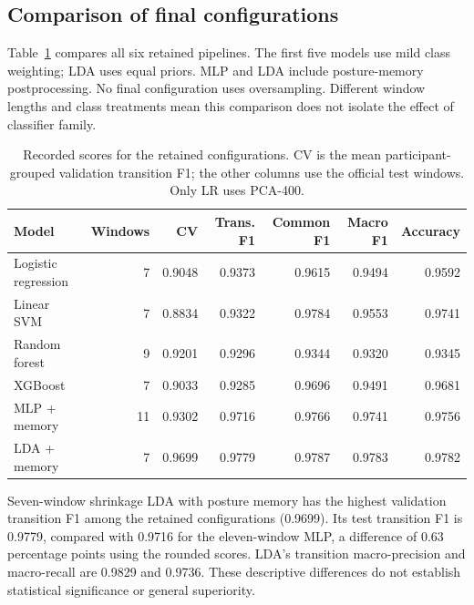 \subsection{Comparison of final configurations}
Table~\ref{tab:final-evaluation} compares all six retained pipelines. The first
five models use mild class weighting; LDA uses equal priors. MLP and LDA
include posture-memory postprocessing. No final configuration uses oversampling.
Different window lengths and class treatments mean this comparison does not
isolate the effect of classifier family.

\begin{table}[t]
\centering
\small
\caption{Recorded scores for the retained configurations. CV is the mean
participant-grouped validation transition F1; the other columns use the official
test windows. Only LR uses PCA-400.}
\label{tab:final-evaluation}
\begin{tabular}{lrrrrrr}
\hline
Model & Windows & CV & Trans. F1 & Common F1 & Macro F1 & Accuracy \\
\hline
Logistic regression & 7 & 0.9048 & 0.9373 & 0.9615 & 0.9494 & 0.9592 \\
Linear SVM          & 7 & 0.8834 & 0.9322 & 0.9784 & 0.9553 & 0.9741 \\
Random forest       & 9 & 0.9201 & 0.9296 & 0.9344 & 0.9320 & 0.9345 \\
XGBoost             & 7 & 0.9033 & 0.9285 & 0.9696 & 0.9491 & 0.9681 \\
MLP + memory        & 11 & 0.9302 & 0.9716 & 0.9766 & 0.9741 & 0.9756 \\
LDA + memory        & 7 & 0.9699 & 0.9779 & 0.9787 & 0.9783 & 0.9782 \\
\hline
\end{tabular}
\end{table}

Seven-window shrinkage LDA with posture memory has the highest validation
transition F1 among the retained configurations (0.9699). Its test transition
F1 is 0.9779, compared with 0.9716 for the eleven-window MLP, a difference
of 0.63 percentage points using the rounded scores. LDA's transition
macro-precision and macro-recall are 0.9829 and 0.9736. These descriptive
differences do not establish statistical significance or general superiority.

